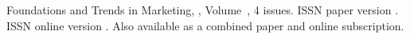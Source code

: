 \journallibraryinfo
 {%
  Foundations and Trends\textsuperscript{\textregistered} in
  Marketing, ,
  Volume~, 4 issues.
  ISSN paper version .
  ISSN online version .
  Also available as a combined paper and online
  subscription.
 } 